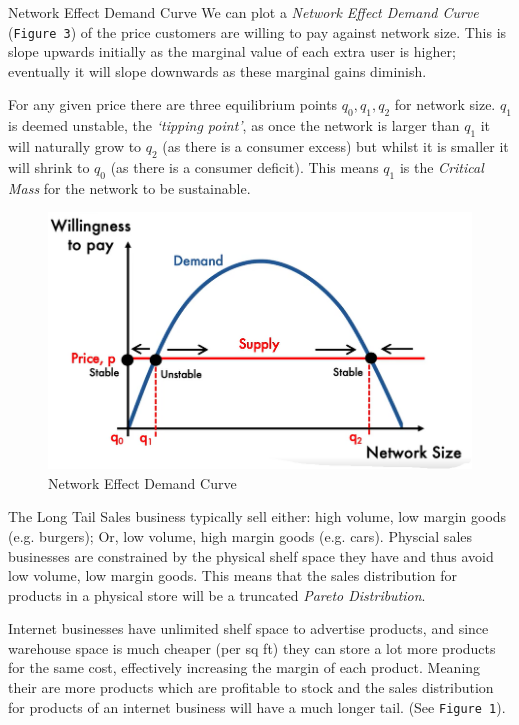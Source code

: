 \documentclass[11pt,a4paper]{article}
\begin{document}
\begin{definition}{Network Effect Demand Curve}
  We can plot a \textit{Network Effect Demand Curve} (\texttt{Figure 3}) of the price customers are willing to pay against network size. This is slope upwards initially as the marginal value of each extra user is higher; eventually it will slope downwards as these marginal gains diminish.

  \par For any given price there are three equilibrium points $q_0,q_1,q_2$ for network size. $q_1$ is deemed unstable, the \textit{`tipping point'}, as once the network is larger than $q_1$ it will naturally grow to $q_2$ (as there is a consumer excess) but whilst it is smaller it will shrink to $q_0$ (as there is a consumer deficit). This means $q_1$ is the \textit{Critical Mass} for the network to be sustainable.
\end{definition}

\begin{figure}[ht!]
  \centering
  \includegraphics[width=.5\textwidth]{networkDemandCurve.PNG}
  \caption{Network Effect Demand Curve}
\end{figure}

\begin{proposition}{The Long Tail}
  Sales business typically sell either: high volume, low margin goods (e.g. burgers); Or, low volume, high margin goods (e.g. cars). Physcial sales businesses are constrained by the physical shelf space they have and thus avoid low volume, low margin goods. This means that the sales distribution for products in a physical store will be a truncated \textit{Pareto Distribution}.\\
  \par Internet businesses have unlimited shelf space to advertise products, and since warehouse space is much cheaper (per sq ft) they can store a lot more products for the same cost, effectively increasing the margin of each product. Meaning their are more products which are profitable to stock and the sales distribution for products of an internet business will have a much longer tail. (See \texttt{Figure 1}).
\end{proposition}
\end{document}

